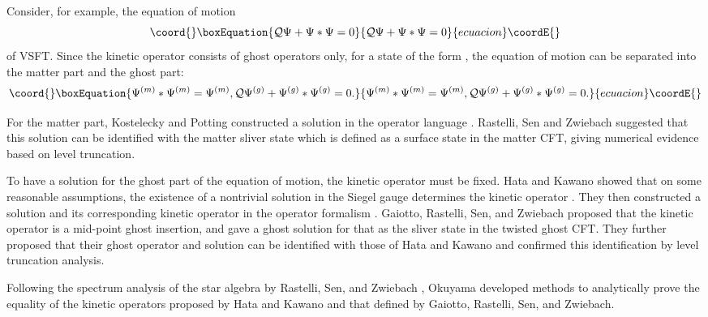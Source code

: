 \documentclass[a4paper,12pt]{article}
\begin{document}
Consider, for example, the equation of motion
\begin{equation}\coord{}\boxEquation{
{\cal Q} \Psi + \Psi \ast \Psi = 0
}{
{\cal Q} \Psi + \Psi \ast \Psi = 0
}{ecuacion}\coordE{}\end{equation}
of VSFT. Since the kinetic operator \coordHE{} consists of ghost
operators only, for a state of the form \coordHE{}, the equation of motion can be separated into the
matter part and the ghost part:
\begin{equation}\coord{}\boxEquation{
\Psi^{(m)} \ast \Psi^{(m)} =\Psi^{(m)},
{\cal Q}\Psi^{(g)}+\Psi^{(g)}\ast \Psi^{(g)}=0.
}{
\Psi^{(m)} \ast \Psi^{(m)} =\Psi^{(m)},
{\cal Q}\Psi^{(g)}+\Psi^{(g)}\ast \Psi^{(g)}=0.
}{ecuacion}\coordE{}\end{equation}

For the matter part, Kostelecky and Potting
constructed a solution \coordHE{}
in the operator language \cite{Kostelecky-Potting}.
Rastelli, Sen and Zwiebach suggested \cite{RSZclassical} that
this solution can be identified with the matter sliver state \coordHE{}
which is defined as a surface state in the matter CFT,
giving numerical evidence based on level truncation.

To have a solution for the ghost part of the equation of motion,
the kinetic operator \coordHE{} must be fixed.
Hata and Kawano showed that on some reasonable assumptions,
the existence of a nontrivial solution in the Siegel gauge
determines the kinetic operator \coordHE{}.
They then constructed a solution \coordHE{} and its corresponding kinetic
operator in the operator formalism \cite{Hata-Kawano}.
Gaiotto, Rastelli, Sen, and Zwiebach proposed
\cite{GRSZstructure} \cite{RSZnote}
that the kinetic operator \coordHE{} is a mid-point
\coordHE{} ghost insertion, and gave a ghost solution for
that \coordHE{} as the sliver state
\coordHE{} in the twisted ghost CFT.
They further proposed that their ghost operator and solution can be
identified with those of Hata and Kawano and confirmed this identification
by level truncation analysis.

Following the spectrum analysis of the star algebra by Rastelli,
Sen, and Zwiebach \cite{RSZspectroscopy},
Okuyama  developed methods \cite{Okuyama-kinetic}
to analytically prove the equality
of the kinetic operators proposed by Hata and Kawano and that defined by
Gaiotto, Rastelli, Sen, and Zwiebach.
\end{document}
